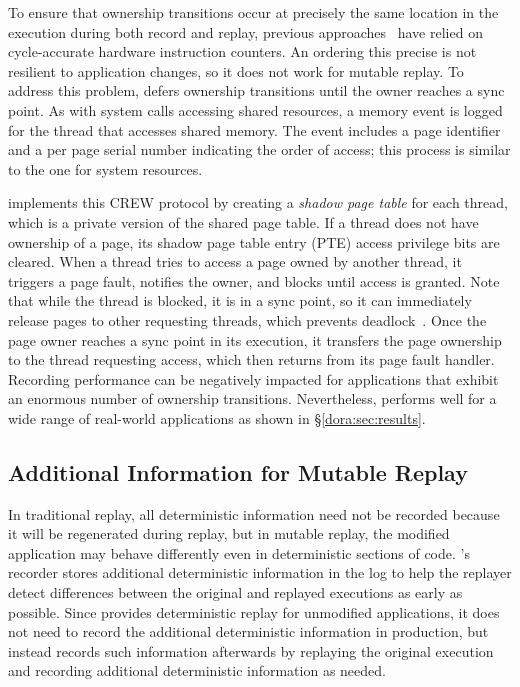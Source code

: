 To ensure that ownership transitions occur at precisely the same
location in the execution during both record and replay, previous
approaches~\cite{bressoud-tft,bressoud,revirt,smp-revirt:vee08}
have relied on cycle-accurate hardware instruction counters.  An ordering
this precise is not resilient to application changes, so it does not work for
mutable replay. To address this problem, {\dora} defers ownership
transitions until the owner reaches a sync point.  As with system
calls accessing shared resources, a memory event is logged for the
thread that accesses shared memory. The event includes a page
identifier and a per page serial number indicating the order of access; this
process is similar to the one for system resources.

{\dora} implements this CREW protocol by creating a
\emph{shadow page table} for each thread, which is a private version
of the shared page table.   If a thread does not have ownership of a
page, its shadow page table entry (PTE) access privilege bits are
cleared.  When a thread tries to access a page owned by another
thread, it triggers a page fault, notifies the owner, and blocks
until access is granted.  Note that while the thread is blocked, it
is in a sync point, so it can immediately release pages to other
requesting threads, which prevents
deadlock~\cite{scribe:sigmetrics10}.  Once the page owner reaches a
sync point in its execution, it transfers the page ownership to the
thread requesting access, which then returns from its page fault
handler.
Recording performance can be negatively impacted for applications that
exhibit an enormous number of ownership transitions.  Nevertheless,
{\dora} performs well for a wide range of 
real-world applications as shown in \S\ref{dora:sec:results}.

\subsection{Additional Information for Mutable Replay}

In traditional replay, all deterministic information need not be
recorded because it will be regenerated during replay, but in mutable
replay, the modified application may behave differently even in
deterministic sections of code.  {\dora}'s recorder stores
additional deterministic information in the log to help the replayer
detect differences between the original and replayed
executions as early as possible.  Since {\dora} provides deterministic replay for
unmodified applications, it does not need to record the additional
deterministic information in production, but instead records such
information afterwards by replaying the original
execution and recording additional deterministic information as
needed.

